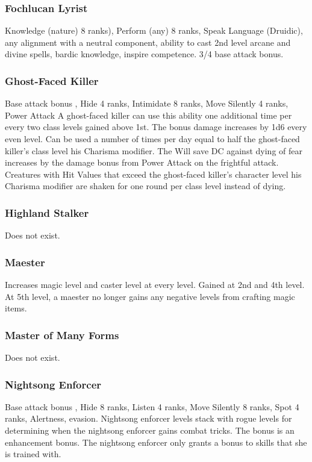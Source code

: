 \subsubsection{Fochlucan Lyrist}
 Knowledge (nature) 8 ranks), Perform (any) 8 ranks, Speak Language (Druidic), any alignment with a neutral component, ability to cast 2nd level arcane and divine spells, bardic knowledge, inspire competence.
 3/4 base attack bonus.
\subsubsection{Ghost-Faced Killer}
 Base attack bonus , Hide 4 ranks, Intimidate 8 ranks, Move Silently 4 ranks, Power Attack
 A ghost-faced killer can use this ability one additional time per every two class levels gained above 1st.
 The bonus damage increases by 1d6 every even level.
 Can be used a number of times per day equal to half the ghost-faced killer's class level \add his Charisma modifier. The Will save DC against dying of fear increases by the damage bonus from Power Attack on the frightful attack. Creatures with Hit Values that exceed the ghost-faced killer's character level \add his Charisma modifier are shaken for one round per class level instead of dying.
\subsubsection{Highland Stalker}
Does not exist.
\subsubsection{Maester}
 Increases magic level and caster level at every level.
 Gained at 2nd and 4th level.
 At 5th level, a maester no longer gains any negative levels from crafting magic items.
\subsubsection{Master of Many Forms}
Does not exist.
\subsubsection{Nightsong Enforcer}
 Base attack bonus , Hide 8 ranks, Listen 4 ranks, Move Silently 8 ranks, Spot 4 ranks, Alertness, evasion.
 Nightsong enforcer levels stack with rogue levels for determining when the nightsong enforcer gains combat tricks.
 The bonus is an enhancement bonus. The nightsong enforcer only grants a bonus to skills that she is trained with.
